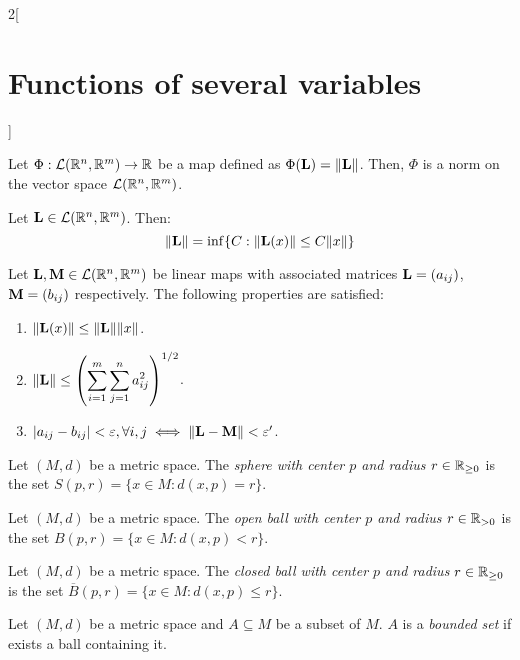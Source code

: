\documentclass[../../../main.tex]{subfiles}
\begin{document}
\begin{multicols}{2}[\section{Functions of several variables}]
    \begin{lemma}
        Let $\Phi:\mathcal{L}(\mathbb{R}^n,\mathbb{R}^m)\rightarrow\mathbb{R} $ be a map defined as $\Phi(\boldsymbol{\mathrm{L}})=\|\boldsymbol{\mathrm{L}}\|$. Then, $\Phi$ is a norm on the vector space $\mathcal{L}(\mathbb{R}^n,\mathbb{R}^m)$.
    \end{lemma}
    \begin{prop}
        Let $\boldsymbol{\mathrm{L}}\in\mathcal{L}(\mathbb{R}^n,\mathbb{R}^m)$. Then: $$\|\boldsymbol{\mathrm{L}}\|=\inf\{C:\|\boldsymbol{\mathrm{L}}(x)\|\leq C\|x\|\}$$
    \end{prop}
    \begin{corollary}
        Let $\boldsymbol{\mathrm{L}},\boldsymbol{\mathrm{M}}\in\mathcal{L}(\mathbb{R}^n,\mathbb{R}^m)$ be linear maps with associated matrices $\boldsymbol{\mathrm{L}}=(a_{ij})$, $\boldsymbol{\mathrm{M}}=(b_{ij})$ respectively. The following properties are satisfied:
        \begin{enumerate}
            \item $\|\boldsymbol{\mathrm{L}}(x)\|\leq\|\boldsymbol{\mathrm{L}}\|\|x\|$.
            \item $\displaystyle\|\boldsymbol{\mathrm{L}}\|\leq\left(\sum_{i=1}^m\sum_{j=1}^na_{ij}^2\right)^{1/2}$.
            \item $|a_{ij}-b_{ij}|<\varepsilon,\forall i,j\iff\|\boldsymbol{\mathrm{L}}-\boldsymbol{\mathrm{M}}\|<\varepsilon'$.
        \end{enumerate}
    \end{corollary}
    \begin{definition}
        Let $(M,d)$ be a metric space. The \textit{sphere with center $p$ and radius $r\in\mathbb{R}_{\geq 0}$} is the set $S(p,r)=\{x\in M:d(x,p)=r\}$.
    \end{definition}
    \begin{definition}
        Let $(M,d)$ be a metric space. The \textit{open ball with center $p$ and radius $r\in\mathbb{R}_{>0}$} is the set $B(p,r)=\{x\in M:d(x,p)<r\}$.
    \end{definition}
    \begin{definition}
        Let $(M,d)$ be a metric space. The \textit{closed ball with center $p$ and radius $r\in\mathbb{R}_{\geq 0}$} is the set $\overline{B}(p,r)=\{x\in M:d(x,p)\leq r\}$.
    \end{definition}
    \begin{definition}
        Let $(M,d)$ be a metric space and $A\subseteq M$ be a subset of $M$. $A$ is a \textit{bounded set} if exists a ball containing it.
    \end{definition}
    \begin{definition}

\end{definition}
\end{multicols}
\end{document}
